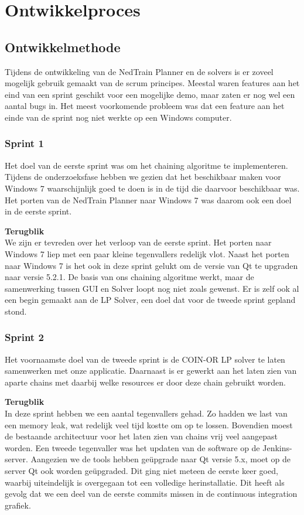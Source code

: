 \section{Ontwikkelproces}
\subsection{Ontwikkelmethode}
Tijdens de ontwikkeling van de NedTrain Planner en de solvers is er zoveel mogelijk gebruik gemaakt van de scrum principes. Meestal waren features aan het eind van een sprint geschikt voor een mogelijke demo, maar zaten er nog wel een aantal bugs in. Het meest voorkomende probleem was dat een feature aan het einde van de sprint nog niet werkte op een Windows computer.

\subsubsection{Sprint 1}
Het doel van de eerste sprint was om het chaining algoritme te implementeren. Tijdens de onderzoeksfase hebben we gezien dat het beschikbaar maken voor Windows 7 waarschijnlijk goed te doen is in de tijd die daarvoor beschikbaar was. Het porten van de NedTrain Planner naar Windows 7 was daarom ook een doel in de eerste sprint. 

\textbf{Terugblik} \\
We zijn er tevreden over het verloop van de eerste sprint. Het porten naar Windows 7 liep met een paar kleine tegenvallers redelijk vlot. Naast het porten naar Windows 7 is het ook in deze sprint gelukt om de versie van Qt te upgraden naar versie 5.2.1. De basis van ons chaining algoritme werkt, maar de samenwerking tussen GUI en Solver loopt nog niet zoals gewenst. Er is zelf ook al een begin gemaakt aan de LP Solver, een doel dat voor de tweede sprint gepland stond. 

\subsubsection{Sprint 2}
Het voornaamste doel van de tweede sprint is de COIN-OR LP solver te laten samenwerken met onze applicatie. Daarnaast is er gewerkt aan het laten zien van aparte chains met daarbij welke resources er door deze chain gebruikt worden. 

\textbf{Terugblik} \\
In deze sprint hebben we een aantal tegenvallers gehad. Zo hadden we last van een memory leak, wat redelijk veel tijd kostte om op te lossen. Bovendien moest de bestaande architectuur voor het laten zien van chains vrij veel aangepast worden. Een tweede tegenvaller was het updaten van de software op de Jenkins-server. Aangezien we de tools hebben ge\"upgrade naar Qt versie 5.x, moet op de server Qt ook worden ge\"upgraded. Dit ging niet meteen de eerste keer goed, waarbij uiteindelijk is overgegaan tot een volledige herinstallatie. Dit heeft als gevolg dat we een deel van de eerste commits missen in de continuous integration grafiek.

